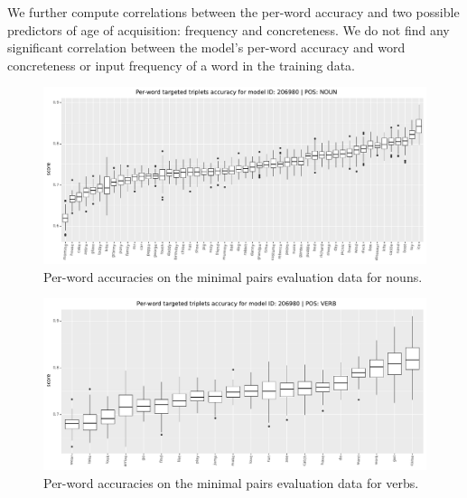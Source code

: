 We further compute correlations between the per-word accuracy and two 
possible predictors of age of acquisition: frequency and concreteness. 
We do not find any significant correlation between the model's per-word 
accuracy and word concreteness or input frequency of a word in the 
training data.



\begin{figure}[htb]
  \centering
  \includegraphics[width=\textwidth]{results/targeted_triplets/results_per_word_version_206980_NOUN.pdf}
  \caption{Per-word accuracies on the minimal pairs evaluation data for nouns.}
  \label{fig:accuracy_targeted_triplets_nouns}
\end{figure}

\begin{figure}[htb]
  \centering
  \includegraphics[width=\textwidth]{results/targeted_triplets/results_per_word_version_206980_VERB.pdf}
  \caption{Per-word accuracies on the minimal pairs evaluation data
    for verbs.}
  \label{fig:accuracy_targeted_triplets_verbs}
\end{figure}
